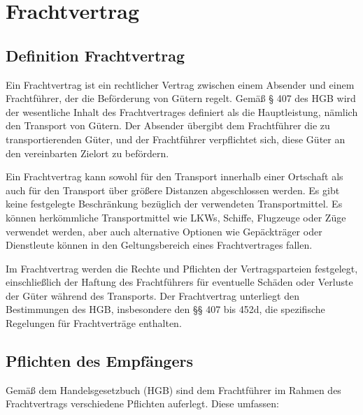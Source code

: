 \chapter{Frachtvertrag}

\section[Definition]{Definition Frachtvertrag}

Ein Frachtvertrag ist ein rechtlicher Vertrag zwischen einem Absender und einem Frachtführer, der die Beförderung von Gütern regelt. Gemäß § 407 des \ac{HGB} wird der wesentliche Inhalt des Frachtvertrages definiert als die Hauptleistung, nämlich den Transport von Gütern. Der Absender übergibt dem Frachtführer die zu transportierenden Güter, und der Frachtführer verpflichtet sich, diese Güter an den vereinbarten Zielort zu befördern.

Ein Frachtvertrag kann sowohl für den Transport innerhalb einer Ortschaft als auch für den Transport über größere Distanzen abgeschlossen werden. Es gibt keine festgelegte Beschränkung bezüglich der verwendeten Transportmittel. Es können herkömmliche Transportmittel wie LKWs, Schiffe, Flugzeuge oder Züge verwendet werden, aber auch alternative Optionen wie Gepäckträger oder Dienstleute können in den Geltungsbereich eines Frachtvertrages fallen.

Im Frachtvertrag werden die Rechte und Pflichten der Vertragsparteien festgelegt, einschließlich der Haftung des Frachtführers für eventuelle Schäden oder Verluste der Güter während des Transports. Der Frachtvertrag unterliegt den Bestimmungen des \ac{HGB}, insbesondere den §§ 407 bis 452d, die spezifische Regelungen für Frachtverträge enthalten.

\section{Pflichten des Empfängers}

Gemäß dem Handelsgesetzbuch (HGB) sind dem Frachtführer im Rahmen des Frachtvertrags verschiedene Pflichten auferlegt. Diese umfassen:

